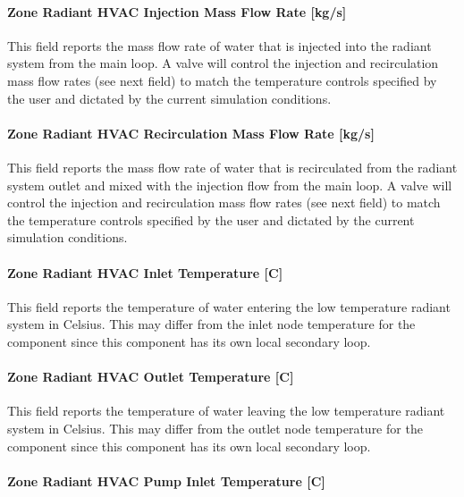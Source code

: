 \paragraph{Zone Radiant HVAC Injection Mass Flow Rate {[}kg/s{]}}\label{zone-radiant-hvac-injection-mass-flow-rate-kgs}

This field reports the mass flow rate of water that is injected into the radiant system from the main loop. A valve will control the injection and recirculation mass flow rates (see next field) to match the temperature controls specified by the user and dictated by the current simulation conditions.

\paragraph{Zone Radiant HVAC Recirculation Mass Flow Rate {[}kg/s{]}}\label{zone-radiant-hvac-recirculation-mass-flow-rate-kgs}

This field reports the mass flow rate of water that is recirculated from the radiant system outlet and mixed with the injection flow from the main loop. A valve will control the injection and recirculation mass flow rates (see next field) to match the temperature controls specified by the user and dictated by the current simulation conditions.

\paragraph{Zone Radiant HVAC Inlet Temperature {[}C{]}}\label{zone-radiant-hvac-inlet-temperature-c-1}

This field reports the temperature of water entering the low temperature radiant system in Celsius. This may differ from the inlet node temperature for the component since this component has its own local secondary loop.

\paragraph{Zone Radiant HVAC Outlet Temperature {[}C{]}}\label{zone-radiant-hvac-outlet-temperature-c-1}

This field reports the temperature of water leaving the low temperature radiant system in Celsius. This may differ from the outlet node temperature for the component since this component has its own local secondary loop.

\paragraph{Zone Radiant HVAC Pump Inlet Temperature {[}C{]}}\label{zone-radiant-hvac-pump-inlet-temperature-c}

